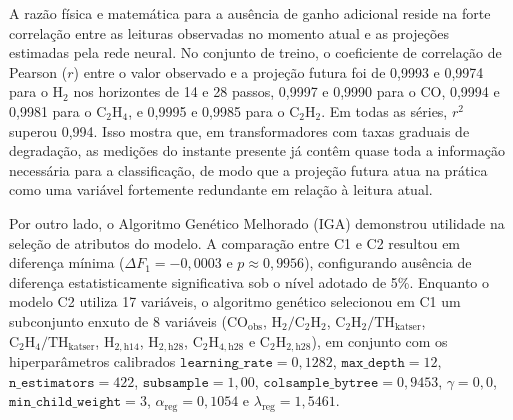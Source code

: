 \begin{table}[H]
\centering
\caption{Comparações pareadas via bootstrap (5.000 iterações) no Track A.}
\label{tab:track_a_pareada}
\end{table}

A razão física e matemática para a ausência de ganho adicional reside na forte correlação entre as leituras observadas no momento atual e as projeções estimadas pela rede neural. No conjunto de treino, o coeficiente de correlação de Pearson ($r$) entre o valor observado e a projeção futura foi de 0,9993 e 0,9974 para o $\text{H}_2$ nos horizontes de 14 e 28 passos, 0,9997 e 0,9990 para o $\text{CO}$, 0,9994 e 0,9981 para o $\text{C}_2\text{H}_4$, e 0,9995 e 0,9985 para o $\text{C}_2\text{H}_2$. Em todas as séries, $r^2$ superou 0,994. Isso mostra que, em transformadores com taxas graduais de degradação, as medições do instante presente já contêm quase toda a informação necessária para a classificação, de modo que a projeção futura atua na prática como uma variável fortemente redundante em relação à leitura atual.

Por outro lado, o Algoritmo Genético Melhorado (IGA) demonstrou utilidade na seleção de atributos do modelo. A comparação entre C1 e C2 resultou em diferença mínima ($\Delta F_1 = -0,0003$ e $p \approx 0,9956$), configurando ausência de diferença estatisticamente significativa sob o nível adotado de 5\%. Enquanto o modelo C2 utiliza 17 variáveis, o algoritmo genético selecionou em C1 um subconjunto enxuto de 8 variáveis ($\text{CO}_{\text{obs}}$, $\text{H}_2/\text{C}_2\text{H}_2$, $\text{C}_2\text{H}_2/\text{TH}_{\text{katser}}$, $\text{C}_2\text{H}_4/\text{TH}_{\text{katser}}$, $\text{H}_{2,\text{h14}}$, $\text{H}_{2,\text{h28}}$, $\text{C}_2\text{H}_{4,\text{h28}}$ e $\text{C}_2\text{H}_{2,\text{h28}}$), em conjunto com os hiperparâmetros calibrados $\texttt{learning\_rate} = 0,1282$, $\texttt{max\_depth} = 12$, $\texttt{n\_estimators} = 422$, $\texttt{subsample} = 1,00$, $\texttt{colsample\_bytree} = 0,9453$, $\gamma = 0,0$, $\texttt{min\_child\_weight} = 3$, $\alpha_{\text{reg}} = 0,1054$ e $\lambda_{\text{reg}} = 1,5461$. 

